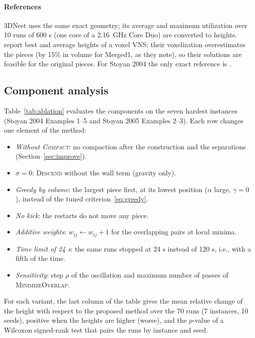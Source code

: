 \documentclass[preprint,12pt,authoryear]{elsarticle}
\begin{document}
\paragraph{References}
3DNest \citep{egeblad2009} uses the same exact geometry; its average and maximum utilization over 10 runs of
600 s (one core of a 2.16~GHz Core Duo) are converted to heights. \citet{lamas2023} report best and average heights
of a voxel VNS; their voxelization overestimates the pieces (by 15\% in volume for Merged1, as they
note), so their solutions are feasible for the original pieces. For Stoyan 2004 the only exact reference is \citet{stoyan2004}.

\subsection{Component analysis}
Table~\ref{tab:ablation} evaluates the components on the seven hardest instances (Stoyan 2004 Examples 1--5 and
Stoyan 2005 Examples 2--3). Each row changes one element of the method:
\begin{itemize}
\item \emph{Without \textsc{Compact}}: no compaction after the construction and the separations
(Section~\ref{sec:improve}).
\item \emph{$\sigma=0$}: \textsc{Descend} without the wall term (gravity only).
\item \emph{Greedy by volume}: the largest piece first, at its lowest position ($\alpha$ large, $\gamma=0$), instead
of the tuned criterion~\eqref{eq:greedy}.
\item \emph{No kick}: the restarts do not move any piece.
\item \emph{Additive weights}: $w_{ij}\gets w_{ij}+1$ for the overlapping pairs at local minima.
\item \emph{Time limit of 24 s}: the same runs stopped at 24 s instead of 120 s, i.e., with a fifth of the time.
\item \emph{Sensitivity}: step $\rho$ of the oscillation and maximum number of passes of
\textsc{MinimizeOverlap}.
\end{itemize}
For each variant, the last column of the table gives the mean relative change of the height with respect to the
proposed method over the 70 runs (7 instances, 10 seeds), positive when the heights are higher (worse), and the
$p$-value of a Wilcoxon signed-rank test that pairs the runs by instance and seed.
\end{document}
